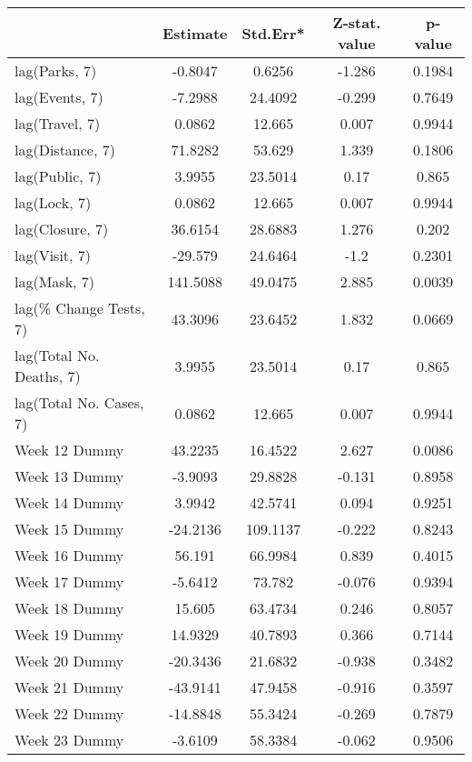 \begingroup\tiny
\begin{longtable}{lcccc}
  \toprule
 & Estimate & Std.Err* & Z-stat. value & p-value \\ 
  \midrule
lag(Parks, 7) & -0.8047 & 0.6256 & -1.286 & 0.1984 \\ 
  lag(Events, 7) & -7.2988 & 24.4092 & -0.299 & 0.7649 \\ 
  lag(Travel, 7) & 0.0862 & 12.665 & 0.007 & 0.9944 \\ 
  lag(Distance, 7) & 71.8282 & 53.629 & 1.339 & 0.1806 \\ 
  lag(Public, 7) & 3.9955 & 23.5014 & 0.17 & 0.865 \\ 
  lag(Lock, 7) & 0.0862 & 12.665 & 0.007 & 0.9944 \\ 
  lag(Closure, 7) & 36.6154 & 28.6883 & 1.276 & 0.202 \\ 
  lag(Visit, 7) & -29.579 & 24.6464 & -1.2 & 0.2301 \\ 
  lag(Mask, 7) & 141.5088 & 49.0475 & 2.885 & 0.0039 \\ 
  lag(\% Change Tests, 7) & 43.3096 & 23.6452 & 1.832 & 0.0669 \\ 
  lag(Total No. Deaths, 7) & 3.9955 & 23.5014 & 0.17 & 0.865 \\ 
  lag(Total No. Cases, 7) & 0.0862 & 12.665 & 0.007 & 0.9944 \\ 
  Week 12 Dummy & 43.2235 & 16.4522 & 2.627 & 0.0086 \\ 
  Week 13 Dummy & -3.9093 & 29.8828 & -0.131 & 0.8958 \\ 
  Week 14 Dummy & 3.9942 & 42.5741 & 0.094 & 0.9251 \\ 
  Week 15 Dummy & -24.2136 & 109.1137 & -0.222 & 0.8243 \\ 
  Week 16 Dummy & 56.191 & 66.9984 & 0.839 & 0.4015 \\ 
  Week 17 Dummy & -5.6412 & 73.782 & -0.076 & 0.9394 \\ 
  Week 18 Dummy & 15.605 & 63.4734 & 0.246 & 0.8057 \\ 
  Week 19 Dummy & 14.9329 & 40.7893 & 0.366 & 0.7144 \\ 
  Week 20 Dummy & -20.3436 & 21.6832 & -0.938 & 0.3482 \\ 
  Week 21 Dummy & -43.9141 & 47.9458 & -0.916 & 0.3597 \\ 
  Week 22 Dummy & -14.8848 & 55.3424 & -0.269 & 0.7879 \\ 
  Week 23 Dummy & -3.6109 & 58.3384 & -0.062 & 0.9506 \\ 

\end{longtable}

